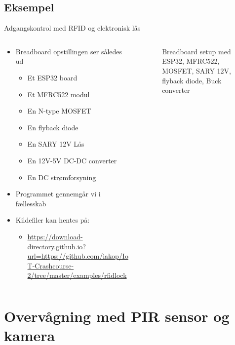 \documentclass[aspectratio=169]{beamer}
\begin{document}
\subsection{Eksempel}
\begin{frame}{Adgangskontrol med RFID og elektronisk lås}
\begin{columns}
	\begin{column}{0.5\textwidth}
		\begin{textBox}
		\begin{itemize}
			\item Breadboard opstillingen ser således ud
			\begin{itemize}
				\item Et ESP32 board
				\item Et MFRC522 modul
				\item En N-type MOSFET
				\item En flyback diode
				\item En SARY 12V Lås
				\item En 12V-5V DC-DC converter
				\item En DC strømforsyning
			\end{itemize}
			\item Programmet gennemgår vi i fællesskab
			\item Kildefiler kan hentes på:
			\begin{itemize}
				\item \tiny\url{https://download-directory.github.io?url=https://github.com/iakop/IoT-Crashcourse-2/tree/master/examples/rfidlock}
			\end{itemize}
		\end{itemize}
		\end{textBox}
	\end{column}
	\begin{column}{0.5\textwidth}
		\centering
		\begin{figure}
  			
  			\caption{Breadboard setup med ESP32, MFRC522, MOSFET, SARY 12V, flyback diode, Buck converter}
  			\label{fig:rfidlock}
		\end{figure}
	\end{column}
\end{columns}
\end{frame}

\section{Overvågning med PIR sensor og kamera}
\begin{frame}
\end{frame}
\end{document}
